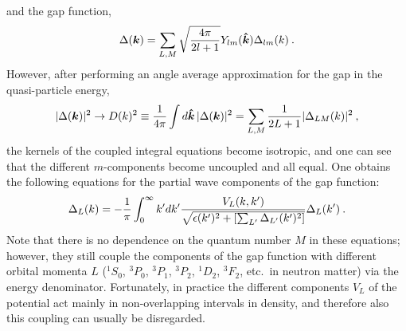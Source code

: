 \documentclass[preprint,rmp,aps,floatfix]{revtex4}
\begin{document}
and the gap function,
\begin{equation}
  \Delta(\bm{k}) = 
  \sum_{L,M} \sqrt{4\pi\over 2l+1} Y_{lm}(\bm{\hat{k}}) \Delta_{lm}(k) \:.
\end{equation}
However, after performing an angle average approximation for the gap in the
quasi-particle energy,
\begin{equation}
  |\Delta(\bm{k})|^2 \rightarrow D(k)^2 \equiv 
  {1\over 4\pi} \int d\bm{\hat{k}}\, |\Delta(\bm{k})|^2 =
  \sum_{L,M} {1\over 2L+1} |\Delta_{LM}(k)|^2 \:,
\end{equation}
the kernels of the coupled integral equations become isotropic, and one can 
see that the different $m$-components become uncoupled and all equal. 
One obtains the following equations for the 
partial wave components of the gap function:
\begin{equation}
  \Delta_L(k) = - {1\over\pi} \int_0^\infty 
  k' dk'{V_L(k,k') \over \sqrt{ \epsilon(k')^2 + 
  \left[\sum_{L'} \Delta_{L'}(k')^2 \right] }}
  \Delta_L(k') \:.
\end{equation}
Note that there is no dependence on the quantum number $M$ in these 
equations; however, they still couple the components of the
gap function with different orbital momenta $L$ 
($^1S_0$, $^3P_0$, $^3P_1$, $^3P_2$, $^1D_2$, $^3F_2$, etc.~in neutron matter) 
via the energy denominator.
Fortunately, in practice the different components $V_L$ of the potential
act mainly in non-overlapping intervals in density, 
and therefore also this coupling can usually be disregarded.
\end{document}
